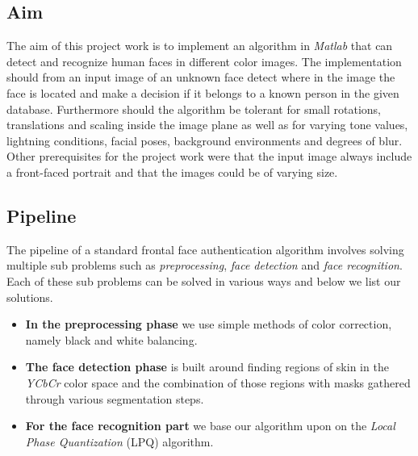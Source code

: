\subsection{Aim}
The aim of this project work is to implement an algorithm in \textit{Matlab} that can detect and recognize human faces in different color images. The implementation should from an input image of an unknown face detect where in the image the face is located and make a decision if it belongs to a known person in the given database. Furthermore should the algorithm be tolerant for small rotations, translations and scaling inside the image plane as well as for varying tone values, lightning conditions, facial poses, background environments and degrees of blur. Other prerequisites for the project work were that the input image always include a front-faced portrait and that the images could be of varying size.


\subsection{Pipeline}
The pipeline of a standard frontal face authentication algorithm involves solving multiple sub problems such as \textit{preprocessing}, \textit{face detection} and \textit{face recognition}. Each of these sub problems can be solved in various ways and below we list our solutions.

\begin{itemize}
  \item \textbf{In the preprocessing phase} we use simple methods of color correction, namely black and white balancing. 
  \item \textbf{The face detection phase} is built around finding regions of skin in the \textit{YCbCr} color space and the combination of those regions with masks gathered through various segmentation steps. 
  \item \textbf{For the face recognition part} we base our algorithm upon on the \textit{Local Phase Quantization} (LPQ) algorithm. 

\end{itemize}
